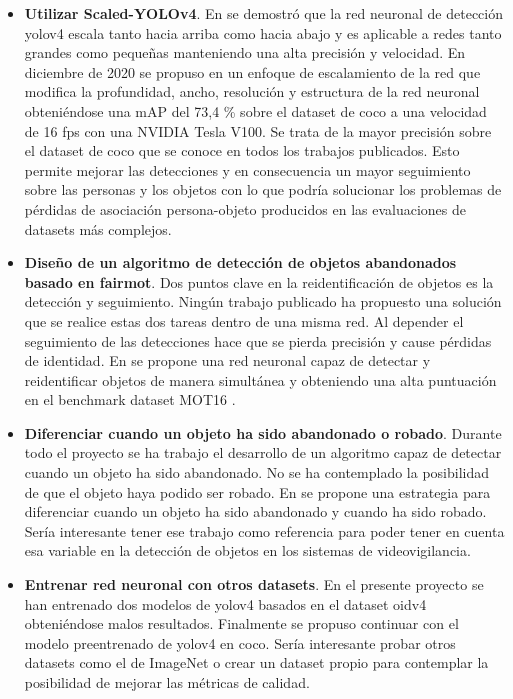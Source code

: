 \begin{itemize}
    \item \textbf{Utilizar Scaled-YOLOv4}. En \cite{bochkovskiy2020yolov4} se demostró que la red neuronal de detección \gls{yolov4} escala tanto hacia arriba como hacia abajo y es aplicable a redes tanto grandes como pequeñas manteniendo una alta precisión y velocidad. En diciembre de 2020 se propuso en \cite{wang2021scaledyolov4} un enfoque de escalamiento de la red que modifica la profundidad, ancho, resolución y estructura de la red neuronal obteniéndose una mAP del 73,4 \% sobre el dataset de \gls{coco} a una velocidad de 16 \gls{fps} con una NVIDIA Tesla V100. Se trata de la mayor precisión sobre el dataset de \gls{coco} que se conoce en todos los trabajos publicados. Esto permite mejorar las detecciones y en consecuencia un mayor seguimiento sobre las personas y los objetos con lo que podría solucionar los problemas de pérdidas de asociación persona-objeto producidos en las evaluaciones de datasets más complejos.
    \item \textbf{Diseño de un algoritmo de detección de objetos abandonados basado en \gls{fairmot}}. Dos puntos clave en la reidentificación de objetos es la detección y seguimiento. Ningún trabajo publicado ha propuesto una solución que se realice estas dos tareas dentro de una misma red. Al depender el seguimiento de las detecciones hace que se pierda precisión y cause pérdidas de identidad. En \cite{zhang2020fair} se propone una red neuronal capaz de detectar y reidentificar objetos de manera simultánea y obteniendo una alta puntuación en el benchmark dataset MOT16 \cite{milan2016mot16}.
    \item \textbf{Diferenciar cuando un objeto ha sido abandonado o robado}. Durante todo el proyecto se ha trabajo el desarrollo de un algoritmo capaz de detectar cuando un objeto ha sido abandonado. No se ha contemplado la posibilidad de que el objeto haya podido ser robado. En \cite{9079525} se propone una estrategia para diferenciar cuando un objeto ha sido abandonado y cuando ha sido robado. Sería interesante tener ese trabajo como referencia para poder tener en cuenta esa variable en la detección de objetos en los sistemas de videovigilancia.
    \item \textbf{Entrenar red neuronal con otros datasets}. En el presente proyecto se han entrenado dos modelos de \gls{yolov4} basados en el dataset \gls{oidv4} obteniéndose malos resultados. Finalmente se propuso continuar con el modelo preentrenado de \gls{yolov4} en \gls{coco}. Sería interesante probar otros datasets como el de ImageNet \cite{russakovsky2015imagenet} o crear un dataset propio para contemplar la posibilidad de mejorar las métricas de calidad.

\end{itemize}
